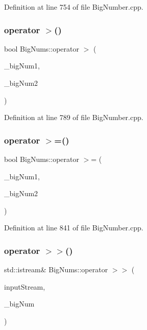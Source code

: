 Definition at line 754 of file Big\+Number.\+cpp.

\mbox{\label{namespace_big_nums_a8da493ab5dba979579d6ceeec7b1ac14}} 
\subsubsection{\texorpdfstring{operator $>$()}{operator >()}}
{\footnotesize\ttfamily bool Big\+Nums\+::operator $>$ (\begin{DoxyParamCaption}\item[{const \mbox{\hyperlink{class_big_nums_1_1_big_number}{Big\+Number}} \&}]{\+\_\+big\+Num1,  }\item[{const \mbox{\hyperlink{class_big_nums_1_1_big_number}{Big\+Number}} \&}]{\+\_\+big\+Num2 }\end{DoxyParamCaption})}



Definition at line 789 of file Big\+Number.\+cpp.

\mbox{\label{namespace_big_nums_afde1be123ae1b999f1913f801d6aa286}} 
\subsubsection{\texorpdfstring{operator $>$=()}{operator >=()}}
{\footnotesize\ttfamily bool Big\+Nums\+::operator $>$= (\begin{DoxyParamCaption}\item[{const \mbox{\hyperlink{class_big_nums_1_1_big_number}{Big\+Number}} \&}]{\+\_\+big\+Num1,  }\item[{const \mbox{\hyperlink{class_big_nums_1_1_big_number}{Big\+Number}} \&}]{\+\_\+big\+Num2 }\end{DoxyParamCaption})}



Definition at line 841 of file Big\+Number.\+cpp.

\mbox{\label{namespace_big_nums_a842a1460ed950581d97b842d8fb42910}} 
\subsubsection{\texorpdfstring{operator $>$$>$()}{operator >>()}\hspace{0.1cm}{\footnotesize\ttfamily [1/2]}}
{\footnotesize\ttfamily std\+::istream\& Big\+Nums\+::operator $>$$>$ (\begin{DoxyParamCaption}\item[{std\+::istream \&}]{input\+Stream,  }\item[{\mbox{\hyperlink{class_big_nums_1_1_big_number}{Big\+Number}} \&}]{\+\_\+big\+Num }\end{DoxyParamCaption})}



